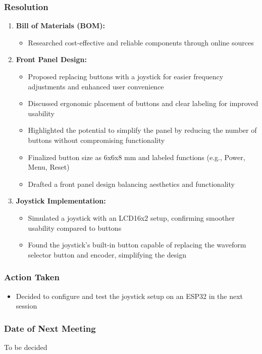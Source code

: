 \documentclass[12pt,a4paper]{article}
\begin{document}
\subsubsection*{Resolution}
\begin{enumerate}
    \item \textbf{Bill of Materials (BOM):}
    \begin{itemize}
        \item Researched cost-effective and reliable components through online sources
    \end{itemize}
    \item \textbf{Front Panel Design:}
    \begin{itemize}
        \item Proposed replacing buttons with a joystick for easier frequency adjustments and enhanced user convenience
        \item Discussed ergonomic placement of buttons and clear labeling for improved usability
        \item Highlighted the potential to simplify the panel by reducing the number of buttons without compromising functionality
        \item Finalized button size as 6x6x8 mm and labeled functions (e.g., Power, Menu, Reset)
        \item Drafted a front panel design balancing aesthetics and functionality
    \end{itemize}
    \item \textbf{Joystick Implementation:}
    \begin{itemize}
        \item Simulated a joystick with an LCD16x2 setup, confirming smoother usability compared to buttons
        \item Found the joystick's built-in button capable of replacing the waveform selector button and encoder, simplifying the design
    \end{itemize}
\end{enumerate}

\subsubsection*{Action Taken}
\begin{itemize}
    \item Decided to configure and test the joystick setup on an ESP32 in the next session
\end{itemize}

\subsubsection*{Date of Next Meeting}
To be decided
\end{document}

